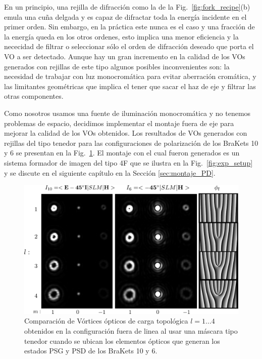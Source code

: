 En un principio, una rejilla de difracción como la de la
Fig.~\ref{fig:fork_recipe}(b)
emula una cuña delgada y es capaz de difractar toda la energía
incidente en el primer orden. Sin embargo, en la
práctica este nunca es el caso y una fracción de la energía queda en
los otros ordenes, esto implica una menor eficiencia y la nececidad de
filtrar o seleccionar sólo el orden de difracción deseado que porta el
VO a ser detectado. Aunque hay un gran incremento en la calidad de los
VOs generados con rejillas de este tipo algunos posibles
inconvenientes son: la necesidad de trabajar con luz monocromática
para evitar aberración cromática, y las limitantes geométricas que
implica el tener que sacar el haz de eje y filtrar las otras
componentes. 

Como nosotros usamos una fuente de iluminación monocromática y no
tenemos problemas de espacio, decidimos implementar el montaje fuera
de eje para mejorar la calidad de los VOs obtenidos. Los resultados de
VOs generados con rejillas del tipo tenedor para las configuraciones
de polarización de los BraKets 10 y 6 se presentan en la
Fig.~\ref{fig:diffracted_OV_I6_and_I10}. El montaje con el cual fueron
generados es un sistema formador de imagen del tipo 4F que se ilustra
en la Fig.~\ref{fig:exp_setup} 
y se discute en el siguiente capítulo en la Sección \ref{sec:montaje_PD}. 
\begin{figure}[h!]
\centering
\includegraphics[scale=0.3]{diffracted_OV_I6_and_I10.pdf}
\caption[Vórtices ópticos difractados por una rejilla tipo
blazed.]{Comparación de Vórtices ópticos de carga topológica $l=1...4$ obtenidos en
  la configuración fuera de linea al usar una máscara tipo tenedor
  cuando se ubican los elementos ópticos que generan los estados PSG y PSD de los
  BraKets 10 y 6.} 
\label{fig:diffracted_OV_I6_and_I10}
\end{figure}

